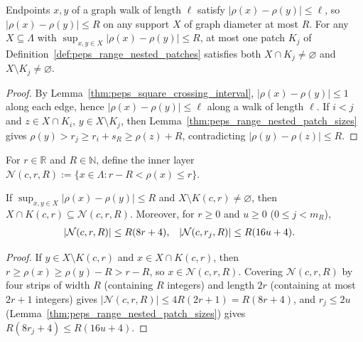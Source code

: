 \begin{lemma}
    \label{thm:peps_range_nested_patch_split}
    \leanok
    Endpoints $x,y$ of a graph walk of length $\ell$ satisfy $|\rho(x)-\rho(y)|\le\ell$, so $|\rho(x)-\rho(y)|\le R$ on any support $X$ of graph diameter at most $R$. For any $X\subseteq\Lambda$ with $\sup_{x,y\in X}|\rho(x)-\rho(y)|\le R$, at most one patch $K_j$ of Definition~\ref{def:peps_range_nested_patches} satisfies both $X\cap K_j\ne\varnothing$ and $X\setminus K_j\ne\varnothing$.
\end{lemma}
\begin{proof}\leanok
    By Lemma~\ref{thm:peps_square_crossing_interval}, $|\rho(x)-\rho(y)|\le1$ along each edge, hence $|\rho(x)-\rho(y)|\le\ell$ along a walk of length $\ell$. If $i<j$ and $z\in X\cap K_i$, $y\in X\setminus K_j$, then Lemma~\ref{thm:peps_range_nested_patch_sizes} gives $\rho(y)>r_j\ge r_i+s_R\ge\rho(z)+R$, contradicting $|\rho(y)-\rho(z)|\le R$.
\end{proof}

\begin{definition}
    \label{def:peps_square_layer}
    \leanok
    For $r\in\mathbb R$ and $R\in\mathbb N$, define the inner layer $\mathcal N(c,r,R):=\{x\in\Lambda:r-R<\rho(x)\le r\}$.
\end{definition}

\begin{lemma}
    \label{thm:peps_square_layer}
    \leanok
    If $\sup_{x,y\in X}|\rho(x)-\rho(y)|\le R$ and $X\setminus K(c,r)\ne\varnothing$, then $X\cap K(c,r)\subseteq\mathcal N(c,r,R)$. Moreover, for $r\ge0$ and $u\ge0$ ($0\le j<m_R$),
    \begin{align}
        |\mathcal N(c,r,R)|   & \le R(8r+4),         &
        |\mathcal N(c,r_j,R)| & \le R(16u+4). \notag
    \end{align}
\end{lemma}
\begin{proof}\leanok
    If $y\in X\setminus K(c,r)$ and $x\in X\cap K(c,r)$, then $r\ge\rho(x)\ge\rho(y)-R>r-R$, so $x\in\mathcal N(c,r,R)$. Covering $\mathcal N(c,r,R)$ by four strips of width $R$ (containing $R$ integers) and length $2r$ (containing at most $2r+1$ integers) gives $|\mathcal N(c,r,R)|\le 4R(2r+1)=R(8r+4)$, and $r_j\le 2u$ (Lemma~\ref{thm:peps_range_nested_patch_sizes}) gives $R(8r_j+4)\le R(16u+4)$.
\end{proof}

